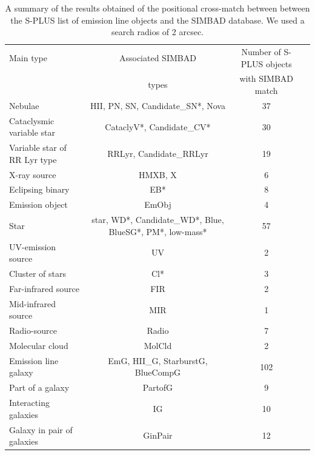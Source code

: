 \documentclass[fleqn,usenatbib]{mnras}
\begin{document}
\begin{table}
\centering
\caption{A summary of the results obtained of the positional cross-match between
        between the S-PLUS list of emission line objects and the SIMBAD database.
        We used a search radios of 2 arcsec.}
\label{tab:simbad-sources}
\begin{tabular}{lccc} %
  \hline
Main type    & Associated SIMBAD           & Number of S-PLUS objects    \\
             & types                        &  with SIMBAD match         \\
\hline
Nebulae                & HII, PN, SN, Candidate\_SN*, Nova  & 37               \\
Cataclysmic variable star  & CataclyV*, Candidate\_CV* & 30              \\
Variable star of RR Lyr type & RRLyr, Candidate\_RRLyr & 19              \\
X-ray source                & HMXB, X                  & 6               \\
Eclipsing binary            & EB*                    & 8                 \\            
Emission object             & EmObj                  & 4                 \\
Star                        & star, WD*, Candidate\_WD*, Blue, BlueSG*, PM*, low-mass* & 57 \\
UV-emission source          & UV                     & 2                 \\
Cluster of stars            & Cl*                    & 3                 \\
Far-infrared source         & FIR                    & 2                 \\
Mid-infrared source         & MIR                    & 1                 \\
Radio-source                & Radio                  & 7                \\
Molecular cloud             & MolCld                 & 2                 \\
Emission line galaxy        & EmG, HII\_G, StarburstG, BlueCompG & 102   \\
Part of a galaxy            & PartofG                & 9                 \\
Interacting galaxies        & IG                     & 10                \\
Galaxy in pair of galaxies      & GinPair            & 12                \\

\end{tabular}
\end{table}
\end{document}
